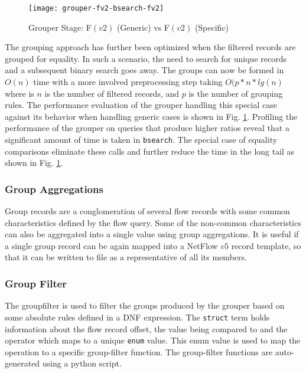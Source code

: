 \begin{figure}[h!]
  \begin{center}
    \texttt{[image: grouper-fv2-bsearch-fv2]}
    \caption{Grouper Stage: F$(v2)$ (Generic) vs F$(v2)$ (Specific)}
    \label{fig:fv1-fv2-grouper}
  \end{center}
\end{figure}

The grouping approach has further been optimized when the filtered records are
grouped for equality. In such a scenario, the need to search for unique
records and a  subsequent binary search goes away.  The groups can now be
formed in $O(n)$ time with a more involved preprocessing step taking
$O(p*n*lg(n)$ where is $n$ is the number of filtered records, and $p$ is the
number of grouping rules. The performance evaluation of the grouper handling
this special case against its behavior when handling generic cases is shown in
Fig. \ref{fig:fv1-fv2-grouper}. Profiling the performance of the grouper on
queries that produce higher ratios reveal that a significant amount of time is
taken in \texttt{bsearch}. The special case of equality comparisons eliminate
these calls and further reduce the time in the long tail as shown in Fig.
\ref{fig:fv1-fv2-grouper}.

\subsubsection{Group Aggregations} Group records are a conglomeration of
several flow records with some common characteristics defined by the flow
query. Some of the non-common characteristics can also be aggregated into a
single value using group aggregations. It is useful if a single group record
can be again mapped into a NetFlow $v5$ record template, so that it can be
written to file as a representative of all its members.

\subsubsection{Group Filter} The groupfilter is used to filter the groups
produced by the grouper based on some absolute rules defined in a \ac{DNF}
expression. The \texttt{struct} term holds information about the flow record
offset, the value being compared to and the operator which maps to a unique
\texttt{enum} value.  This enum value is used to map the operation to a
specific group-filter function. The group-filter functions are auto-generated
using a python script.




